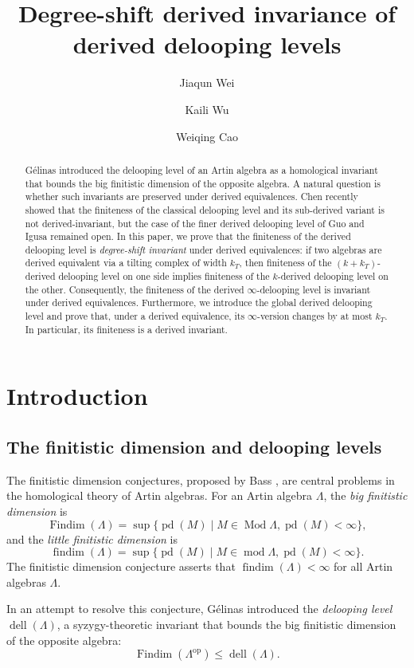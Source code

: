 \documentclass[12pt,a4paper,reqno]{amsart}
\title{Degree-shift derived invariance of derived delooping levels}
\author{Jiaqun Wei}
\author{Kaili Wu}
\author{Weiqing Cao}
\date{}
\theoremstyle{plain}
\theoremstyle{definition}
\theoremstyle{remark}
\DeclareMathOperator{\modd}{mod}
\DeclareMathOperator{\Mod}{Mod}
\DeclareMathOperator{\op}{op}
\DeclareMathOperator{\pd}{pd}
\DeclareMathOperator{\Findim}{Findim}
\DeclareMathOperator{\findim}{findim}
\DeclareMathOperator{\dell}{dell}
\begin{document}
\maketitle

\begin{abstract}
Gélinas introduced the delooping level of an Artin algebra as a homological invariant that bounds the big finitistic dimension of the opposite algebra. A natural question is whether such invariants are preserved under derived equivalences. Chen recently showed that the finiteness of the classical delooping level and its sub-derived variant is not derived-invariant, but the case of the finer derived delooping level of Guo and Igusa remained open. In this paper, we prove that the finiteness of the derived delooping level is \emph{degree-shift invariant} under derived equivalences: if two algebras are derived equivalent via a tilting complex of width $k_T$, then finiteness of the $(k+k_T)$-derived delooping level on one side implies finiteness of the $k$-derived delooping level on the other. Consequently, the finiteness of the derived \(\infty\)-delooping level is invariant under derived equivalences. Furthermore, we introduce the global derived delooping level and prove that, under a derived equivalence, its \(\infty\)-version changes by at most \(k_T\). In particular, its finiteness is a derived invariant.
\end{abstract}

\tableofcontents

\section{Introduction}

\subsection{The finitistic dimension and delooping levels}

The finitistic dimension conjectures, proposed by Bass \cite{Bass}, are central problems in the homological theory of Artin algebras. For an Artin algebra $\Lambda$, the \emph{big finitistic dimension} is
\[
\Findim(\Lambda) = \sup\{\pd(M) \mid M \in \Mod \Lambda, \pd(M) < \infty\},
\]
and the \emph{little finitistic dimension} is
\[
\findim(\Lambda) = \sup\{\pd(M) \mid M \in \modd \Lambda, \pd(M) < \infty\}.
\]
The finitistic dimension conjecture asserts that $\findim(\Lambda) < \infty$ for all Artin algebras $\Lambda$.

In an attempt to resolve this conjecture, Gélinas \cite{Gelinas} introduced the \emph{delooping level} $\dell(\Lambda)$, a syzygy-theoretic invariant that bounds the big finitistic dimension of the opposite algebra:
\begin{equation}\label{eq:gelinas-bound}
\Findim(\Lambda^{\op}) \leq \dell(\Lambda).
\end{equation}
\end{document}

